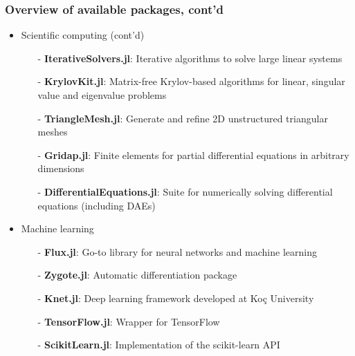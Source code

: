 \documentclass[t,usepdftitle=false]{beamer}
\begin{document}
\begin{frame}
	\frametitle{Overview of available packages, cont'd}
	\begin{itemize}
	\item Scientific computing (cont'd)
	\begin{itemize}\normalsize
		\item[-] \textbf{IterativeSolvers.jl}: Iterative algorithms to solve large linear systems
		\vspace{.05cm}
		\item[-] \textbf{KrylovKit.jl}: Matrix-free Krylov-based algorithms for linear, singular value and eigenvalue problems
		\vspace{.05cm}
		\item[-] \textbf{TriangleMesh.jl}: Generate and refine 2D unstructured triangular meshes
		\vspace{.05cm}
		\item[-] \textbf{Gridap.jl}: Finite elements for partial differential equations in arbitrary dimensions
		\vspace{.05cm}
		\item[-] \textbf{DifferentialEquations.jl}: Suite for numerically solving differential equations (including DAEs)
	\end{itemize}
	\item Machine learning
	\begin{itemize}\normalsize
		\item[-] \textbf{Flux.jl}: Go-to library for neural networks and machine learning
		\vspace{.05cm}
		\item[-] \textbf{Zygote.jl}: Automatic differentiation package
		\vspace{.05cm}
		\item[-] \textbf{Knet.jl}: Deep learning framework developed at Koç University
		\vspace{.05cm}
		\item[-] \textbf{TensorFlow.jl}: Wrapper for TensorFlow
		\vspace{.05cm}
		\item[-] \textbf{ScikitLearn.jl}: Implementation of the scikit-learn API
	\end{itemize}
	\end{itemize}
\end{frame}  
\end{document}
